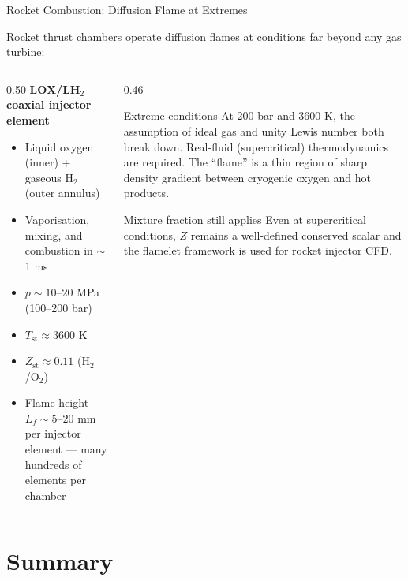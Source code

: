 \documentclass[12pt,aspectratio=169]{beamer}
\newcommand{\Zst}{Z_{\text{st}}}
\newcommand{\Lf}{L_f}
\begin{document}
\begin{frame}{Rocket Combustion: Diffusion Flame at Extremes}

  Rocket thrust chambers operate diffusion flames at conditions
  far beyond any gas turbine:

  \begin{columns}[t]
    \begin{column}{0.50\textwidth}
      \textbf{LOX/LH$_2$ coaxial injector element}
      \begin{itemize}
        \item Liquid oxygen (inner) + gaseous H$_2$ (outer annulus)
        \item Vaporisation, mixing, and combustion in $\sim$1 ms
        \item $p \sim 10$--$20$ MPa (100--200 bar)
        \item $T_{\text{st}} \approx 3600$ K
        \item $\Zst \approx 0.11$ (H$_2$/O$_2$)
        \item Flame height $\Lf \sim 5$--$20$ mm per injector
              element --- many hundreds of elements per chamber
      \end{itemize}
    \end{column}
    \begin{column}{0.46\textwidth}
      \begin{alertblock}{Extreme conditions}
        At 200 bar and 3600 K, the assumption of ideal gas and
        unity Lewis number both break down.
        Real-fluid (supercritical) thermodynamics are required.
        The ``flame'' is a thin region of sharp density gradient
        between cryogenic oxygen and hot products.
      \end{alertblock}
      \vspace{3pt}
      \begin{exampleblock}{Mixture fraction still applies}
        Even at supercritical conditions, $Z$ remains a
        well-defined conserved scalar and the flamelet
        framework is used for rocket injector CFD.
      \end{exampleblock}
    \end{column}
  \end{columns}
\end{frame}

\section{Summary}
\end{document}
